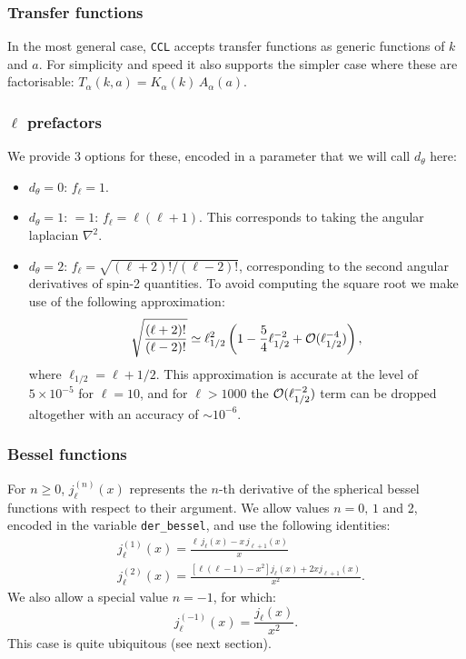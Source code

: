\documentclass[\docopts]{\docclass}
\begin{document}
\subsubsection*{Transfer functions}
In the most general case, {\tt CCL} accepts transfer functions as generic functions of $k$ and $a$. For simplicity and speed it also supports the simpler case where these are factorisable: $T_\alpha(k,a)=K_\alpha(k)\,A_\alpha(a)$.


\subsubsection*{$\ell$ prefactors}
We provide 3 options for these, encoded in a parameter that we will call $d_\theta$ here:
\begin{itemize}
 \item $d_\theta=0$: $f_\ell=1$.
 \item $d_\theta=1$: $=1$: $f_\ell=\ell(\ell+1)$. This corresponds to taking the angular laplacian $\nabla^2$.
 \item $d_\theta=2$: $f_\ell=\sqrt{(\ell+2)!/(\ell-2)!}$, corresponding to the second angular derivatives of spin-2 quantities. To avoid computing the square root we make use of the following approximation:
   \begin{equation}
     \sqrt{\frac{(\ell+2)!}{(\ell-2)!}}\simeq \ell_{1/2}^2\left(1-\frac{5}{4}\ell_{1/2}^{-2}+{\cal O}(\ell_{1/2}^{-4})\right),
   \end{equation}
   where $\ell_{1/2}=\ell+1/2$. This approximation is accurate at the level of $5\times10^{-5}$ for $\ell=10$, and for $\ell>1000$ the ${\cal O}(\ell_{1/2}^{-2})$ term can be dropped altogether with an accuracy of $\sim10^{-6}$.
\end{itemize}

\subsubsection*{Bessel functions}
  For $n\ge0$, $j^{(n)}_\ell(x)$ represents the $n$-th derivative of the spherical bessel functions with respect to their argument. We allow values $n=0,\,1$ and 2, encoded in the variable {\tt der\_bessel}, and use the following identities:
  \begin{align}
    &j^{(1)}_\ell(x)=\frac{\ell\,j_\ell(x)-x\,j_{\ell+1}(x)}{x}\\
    &j^{(2)}_\ell(x)=\frac{[\ell(\ell-1)-x^2]j_\ell(x)+2xj_{\ell+1}(x)}{x^2}.
  \end{align}
  We also allow a special value $n=-1$, for which:
  \begin{equation}
    j^{(-1)}_\ell(x)=\frac{j_\ell(x)}{x^2}.
  \end{equation}
  This case is quite ubiquitous (see next section).
\end{document}
